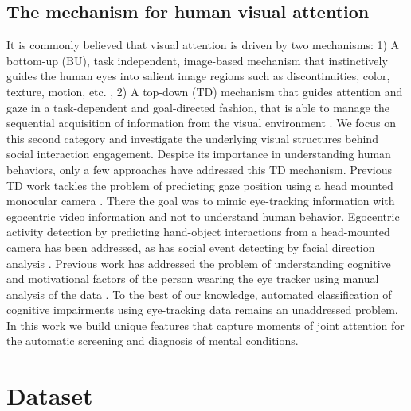 \documentclass[10pt,twocolumn,letterpaper]{article}
\begin{document}
\subsection{The mechanism for human visual attention} It is commonly believed that visual attention is driven by two mechanisms: 1) A bottom-up (BU), task independent, image-based mechanism that instinctively guides the human eyes into salient image regions such as discontinuities, color, texture, motion, etc. \cite{AmodelofsaliencybasedvisualattentionforrapidsceneanalysisItti:tq}, 2) A top-down (TD)  mechanism that guides attention and gaze in a task-dependent and goal-directed fashion, that is able to manage the sequential acquisition of information from the visual environment \cite{HANDEYE, Borji:2012dq}. We focus on this second category and investigate the underlying visual structures behind social interaction engagement. Despite its importance in understanding human behaviors, only a few approaches have addressed this TD mechanism. Previous TD work tackles the problem of predicting gaze position using a head mounted monocular camera \cite{Fathi:2012vk}. There the goal was to mimic eye-tracking information with egocentric video information and not to understand human behavior. Egocentric activity detection by predicting hand-object interactions from a head-mounted camera \cite{Fathi:2013tc} has been addressed, as has social event detecting by facial direction analysis \cite{FromEgotoNosVisionDetectingSocialRelationshipsinFirstPersonViewsAlletto:wi}. Previous work has addressed the problem of understanding cognitive and motivational factors of the person wearing the eye tracker using manual analysis of the data \cite{linda}. To the best of our knowledge, automated classification of cognitive impairments using eye-tracking data remains an unaddressed problem.  In this work we build unique features that capture moments of joint attention for the automatic screening and diagnosis of mental conditions.  
 
\section{Dataset}
\end{document}
